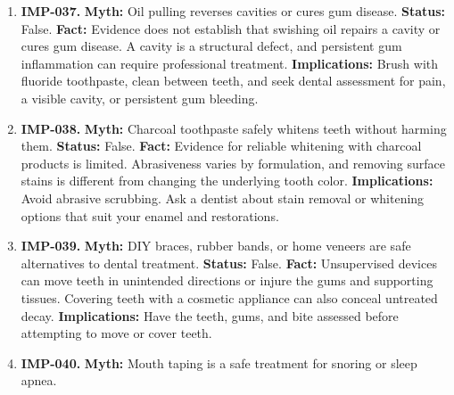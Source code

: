 \documentclass[11pt,oneside]{book}
\begin{document}
\begin{enumerate}[leftmargin=0pt,labelwidth=0pt,labelsep=0pt,itemindent=0pt]
\textbf{Status:} False.\newline
\textbf{Fact:} Some diabetes medicines lower cardiovascular risk, but none eliminates it. Blood pressure, cholesterol, smoking, kidney health, and other factors also affect outcomes. \cite{ref46,ref271}\newline
\textbf{Implications:} Review cardiovascular risk with the care team alongside glucose control.
\item[] \textbf{IMP-037.} \textbf{Myth:} Oil pulling reverses cavities or cures gum disease.\newline
\textbf{Status:} False.\newline
\textbf{Fact:} Evidence does not establish that swishing oil repairs a cavity or cures gum disease. A cavity is a structural defect, and persistent gum inflammation can require professional treatment. \cite{ref50,ref45}\newline
\textbf{Implications:} Brush with fluoride toothpaste, clean between teeth, and seek dental assessment for pain, a visible cavity, or persistent gum bleeding.
\item[] \textbf{IMP-038.} \textbf{Myth:} Charcoal toothpaste safely whitens teeth without harming them.\newline
\textbf{Status:} False.\newline
\textbf{Fact:} Evidence for reliable whitening with charcoal products is limited. Abrasiveness varies by formulation, and removing surface stains is different from changing the underlying tooth color. \cite{ref411}\newline
\textbf{Implications:} Avoid abrasive scrubbing. Ask a dentist about stain removal or whitening options that suit your enamel and restorations.
\item[] \textbf{IMP-039.} \textbf{Myth:} DIY braces, rubber bands, or home veneers are safe alternatives to dental treatment.\newline
\textbf{Status:} False.\newline
\textbf{Fact:} Unsupervised devices can move teeth in unintended directions or injure the gums and supporting tissues. Covering teeth with a cosmetic appliance can also conceal untreated decay. \cite{ref47,ref50}\newline
\textbf{Implications:} Have the teeth, gums, and bite assessed before attempting to move or cover teeth.
\item[] \textbf{IMP-040.} \textbf{Myth:} Mouth taping is a safe treatment for snoring or sleep apnea.\newline

\end{enumerate}
\end{document}
